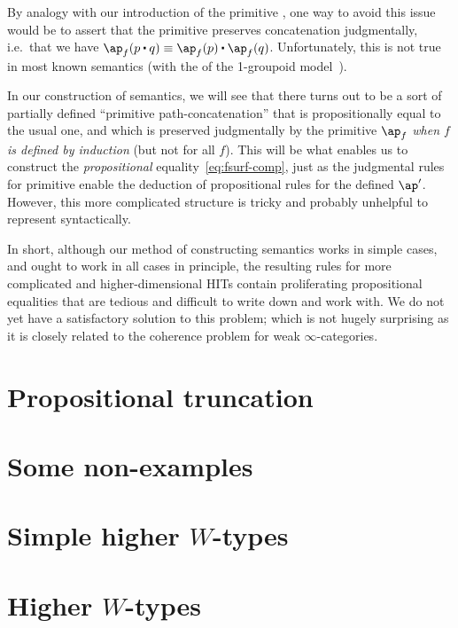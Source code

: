 \documentclass{amsart}
\begin{document}
By analogy with our introduction of the primitive \fap, one way to avoid this issue would be to assert that the primitive \fap preserves concatenation judgmentally, i.e.\ that we have $\ap_{f}(p\ct q) \jdeq \ap_{f}(p) \ct \ap_{f}(q)$.
Unfortunately, this is not true in most known semantics (with the  of the 1-groupoid model~\cite{hs:gpd-typethy}).

In our construction of semantics, we will see that there turns out to be a sort of partially defined ``primitive path-concatenation'' that is propositionally equal to the usual one, and which is preserved judgmentally by the primitive $\ap_{f}$ \emph{when $f$ is defined by induction} (but not for all $f$).
This will be what enables us to construct the \emph{propositional} equality~\eqref{eq:fsurf-comp}, just as the judgmental rules for primitive \fap enable the deduction of propositional rules for the defined $\ap'$.
However, this more complicated structure is tricky and probably unhelpful to represent syntactically.

In short, although our method of constructing semantics works in simple cases, and ought to work in all cases in principle, the resulting rules for more complicated and higher-dimensional HITs contain proliferating propositional equalities that are tedious and difficult to write down and work with.
We do not yet have a satisfactory solution to this problem; which is not hugely surprising as it is closely related to the coherence problem for weak $\infty$-categories.


\section{Propositional truncation}
\label{sec:brck}


\section{Some non-examples}
\label{sec:loopy}


\section{Simple higher $W$-types}
\label{sec:twoconstr-hwt}


\section{Higher $W$-types}
\label{sec:hwt}





\end{document}
